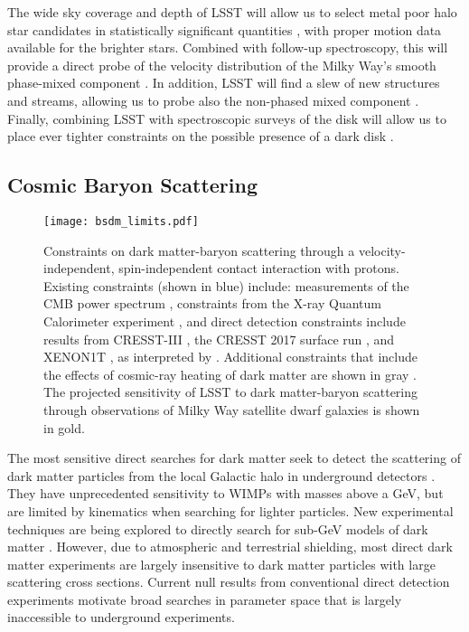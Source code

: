 The wide sky coverage and depth of LSST will allow us to select metal poor halo star candidates in statistically significant quantities \citep[\eg,][]{2017MNRAS.471.2587S}, with proper motion data available for the brighter stars. Combined with follow-up spectroscopy, this will provide a direct probe of the velocity distribution of the Milky Way's smooth phase-mixed component \citep{2018PhRvL.120d1102H}. In addition, LSST will find a slew of new structures and streams, allowing us to probe also the non-phased mixed component \citep{2005PhRvD..71d3516F,2018arXiv181011468E}. Finally, combining LSST with spectroscopic surveys of the disk will allow us to place ever tighter constraints on the possible presence of a dark disk \citep{2015MNRAS.450.2874R}.


\subsection{Cosmic Baryon Scattering }

\begin{figure}
\centering
\texttt{[image: bsdm\_limits.pdf]}
\caption{
Constraints on dark matter-baryon scattering through a velocity-independent, spin-independent contact interaction with protons. 
Existing constraints (shown in blue) include: measurements of the CMB power spectrum \citep[CMB;][]{Gluscevic:2017ywp}, constraints from the X-ray Quantum Calorimeter experiment \citep[XQC;][]{0704.0794}, and direct detection constraints include results from CRESST-III \citep{1711.07692}, the CRESST 2017 surface run \citep{1707.06749}, and XENON1T \citep{1705.06655}, as interpreted by \citet[][]{1802.04764}. %
Additional constraints that include the effects of cosmic-ray heating of dark matter are shown in gray \citep[][]{1810.10543}.
The projected sensitivity of LSST to dark matter-baryon scattering through observations of Milky Way satellite dwarf galaxies is shown in gold.
}
\label{fig:dd}
\end{figure}

The most sensitive direct searches for dark matter seek to detect the scattering of dark matter particles from the local Galactic halo in underground detectors \citep[\eg,][]{1509.08767}. 
They have unprecedented sensitivity to WIMPs with masses above a GeV, but are limited by kinematics when searching for lighter particles. 
New experimental techniques are being explored to directly search for sub-GeV models of dark matter \citep{Battaglieri:2017aum}. 
However, due to atmospheric and terrestrial shielding, most direct dark matter experiments are largely insensitive to dark matter particles with large scattering cross sections. 
Current null results from conventional direct detection experiments motivate broad searches in parameter space that is largely inaccessible to underground experiments. 

